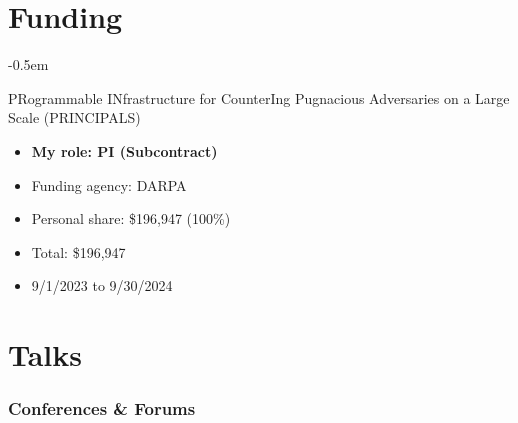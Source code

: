 \documentclass[10pt,singlecolumn]{article} %
\begin{document}

\section{Funding}

\begin{etaremune}
\itemsep -0.5em 

\item PRogrammable INfrastructure for CounterIng Pugnacious Adversaries on a Large Scale (PRINCIPALS) 
    \begin{itemize}[noitemsep,topsep=0pt]
        \item \textbf{My role: PI (Subcontract)}
        \item Funding agency: DARPA
        \item Personal share: \$196,947 (100\%) 
        \item Total: \$196,947
        \item 9/1/2023 to 9/30/2024
    \end{itemize}
\vspace{6pt}

\end{etaremune}


\newpage 


\section{Talks} 

\subsubsection*{Conferences \& Forums}
\end{document}
